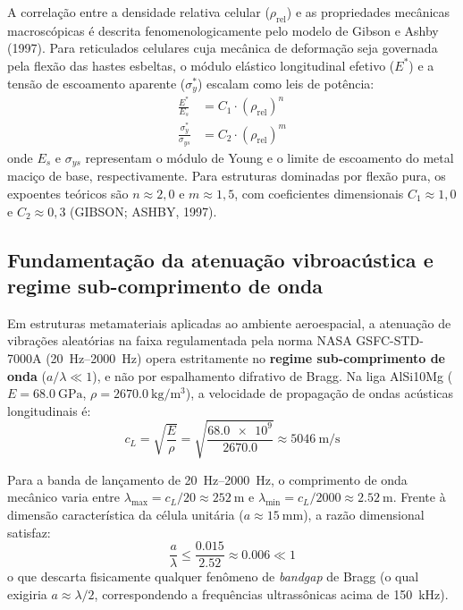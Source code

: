A correlação entre a densidade relativa celular ($\rho_{\text{rel}}$) e as propriedades mecânicas macroscópicas é descrita fenomenologicamente pelo modelo de Gibson e Ashby (1997). Para reticulados celulares cuja mecânica de deformação seja governada pela flexão das hastes esbeltas, o módulo elástico longitudinal efetivo ($E^*$) e a tensão de escoamento aparente ($\sigma_y^*$) escalam como leis de potência:
\begin{align}
  \frac{E^*}{E_s} &= C_1 \cdot \left(\rho_{\text{rel}}\right)^{n} \label{eq:ga-modulus} \\
  \frac{\sigma_y^*}{\sigma_{ys}} &= C_2 \cdot \left(\rho_{\text{rel}}\right)^{m} \label{eq:ga-yield}
\end{align}
onde $E_s$ e $\sigma_{ys}$ representam o módulo de Young e o limite de escoamento do metal maciço de base, respectivamente. Para estruturas dominadas por flexão pura, os expoentes teóricos são $n \approx 2{,}0$ e $m \approx 1{,}5$, com coeficientes dimensionais $C_1 \approx 1{,}0$ e $C_2 \approx 0{,}3$ (GIBSON; ASHBY, 1997).

\subsection{Fundamentação da atenuação vibroacústica e regime sub-comprimento de onda}
\label{subsec:rev-acustica-sublambda}

Em estruturas metamateriais aplicadas ao ambiente aeroespacial, a atenuação de vibrações aleatórias na faixa regulamentada pela norma NASA GSFC-STD-7000A (\SIrange{20}{2000}{\hertz}) opera estritamente no \textbf{regime sub-comprimento de onda} ($a/\lambda \ll 1$), e não por espalhamento difrativo de Bragg. Na liga AlSi10Mg ($E = \SI{68.0}{\giga\pascal}$, $\rho = \SI{2670.0}{\kilo\gram\per\cubic\metre}$), a velocidade de propagação de ondas acústicas longitudinais é:
\begin{equation}
  c_L = \sqrt{\frac{E}{\rho}} = \sqrt{\frac{\num{68.0e9}}{\num{2670.0}}} \approx \SI{5046}{\metre\per\second}
  \label{eq:velocidade-som}
\end{equation}

Para a banda de lançamento de \SIrange{20}{2000}{\hertz}, o comprimento de onda mecânico varia entre $\lambda_{\max} = c_L / \num{20} \approx \SI{252}{\metre}$ e $\lambda_{\min} = c_L / \num{2000} \approx \SI{2.52}{\metre}$. Frente à dimensão característica da célula unitária ($a \approx \SI{15}{\milli\metre}$), a razão dimensional satisfaz:
\begin{equation}
  \frac{a}{\lambda} \le \frac{\num{0.015}}{\num{2.52}} \approx \num{0.006} \ll 1
  \label{eq:razao-sublambda}
\end{equation}
o que descarta fisicamente qualquer fenômeno de \textit{bandgap} de Bragg (o qual exigiria $a \approx \lambda/2$, correspondendo a frequências ultrassônicas acima de \SI{150}{\kilo\hertz}).


